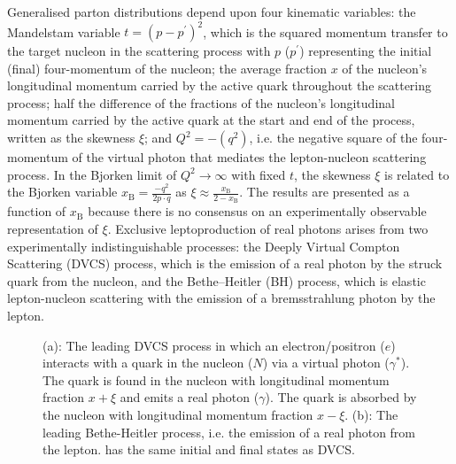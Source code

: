 Generalised parton distributions depend upon four kinematic variables: the
Mandelstam variable $t=(p-p^{\prime})^2$, which is the squared momentum
transfer to the target nucleon in the  scattering process with $p$ ($p^{\prime}$)
representing the initial (final) four-momentum of the nucleon; the average
fraction $x$ of the nucleon's longitudinal momentum carried by the active
quark throughout the scattering process; half the difference of
  the fractions of the nucleon's longitudinal momentum carried
by the active quark at the start and end of the process, written as
the skewness $\xi$; and $Q^2=-(q^2)$, i.e. the negative square of the four-momentum of
the virtual photon that mediates the lepton-nucleon scattering
process. In the Bjorken limit of $Q^2\rightarrow\infty$ with fixed
$t$, the skewness $\xi$ is related to the Bjorken variable
$x_{\textrm{B}}=\frac{-q^2}{2p\cdot q}$ as
$\xi\approx\frac{x_\textrm{B}}{2-x_\textrm{B}}$. The results are presented
as a function of $x_{\textrm{B}}$ because there is no consensus on an experimentally observable representation of $\xi$. 
Exclusive leptoproduction of real photons
 arises from
two experimentally indistinguishable processes: the Deeply Virtual Compton Scattering (DVCS) process,
which is the emission of a real photon by the struck quark from the nucleon, and the Bethe--Heitler (BH) process, which is elastic lepton-nucleon scattering with the emission of a bremsstrahlung photon by the lepton.
\begin{figure}
\begin{center}
\caption[DVCS and Bethe Heitler hand bag diagram.]{(a): The leading DVCS process in which an electron/positron ($e$) interacts with a quark in the nucleon
($N$) via a virtual photon ($\gamma^\ast$). The quark is found in the
nucleon with longitudinal momentum fraction $x+\xi$ and emits a real
photon ($\gamma$). The quark is absorbed by the nucleon with
longitudinal momentum fraction $x-\xi$. (b): The leading Bethe-Heitler process, i.e. the emission of a real photon from the  lepton.  has the same initial and final states as DVCS.}
\label{spin}
\end{center}
\end{figure}
